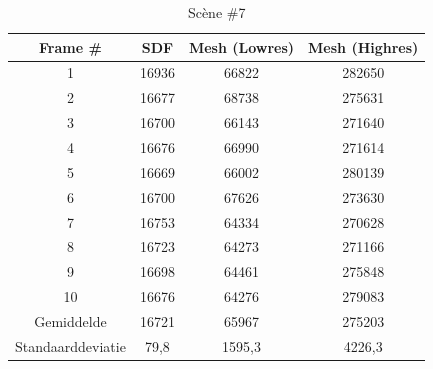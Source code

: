 \documentclass[12pt, a4paper]{article}
\begin{document}
\begin{table}[H]
	\centering
	\begin{tabular}{| c | c c c |}
		\hline
		Frame \# & SDF & Mesh (Lowres) & Mesh (Highres) \\
		\hline
		1 &16936 &66822 &282650 \\
		2 &16677 &68738 &275631 \\
		3 &16700 &66143 &271640 \\
		4 &16676 &66990 &271614 \\
		5 &16669 &66002 &280139 \\
		6 &16700 &67626 &273630 \\
		7 &16753 &64334 &270628 \\
		8 &16723 &64273 &271166 \\
		9 &16698 &64461 &275848 \\
		10 &16676 &64276 &279083 \\
		\hline
		Gemiddelde &16721 &65967 &275203 \\
		Standaarddeviatie &79,8 &1595,3 &4226,3 \\
		\hline
	\end{tabular}
	\caption{Scène \#7}
\end{table}
\end{document}

